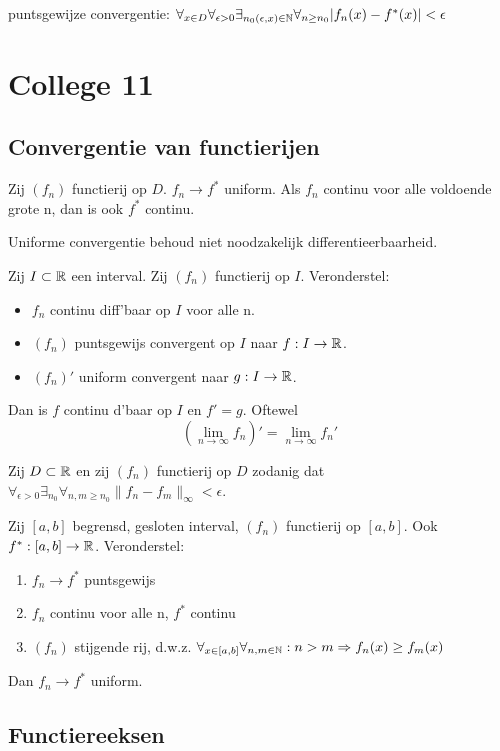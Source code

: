 \documentclass[week=1]{homework}
\begin{document}
	\Letop puntsgewijze convergentie:
	$\forall_{x \in D} \forall_{\epsilon > 0} \exists_{n_0(\epsilon, x) \in \naturals} \forall_{n \ge n_0} |f_n(x) - f^*(x)| < \epsilon$ 
	
	\newpage
	\section*{College 11}
	
	\subsection*{Convergentie van functierijen}
	
	\Stel Zij $(f_n)$ functierij op $D$. $f_n \to f^*$ uniform. Als $f_n$ continu voor alle voldoende grote n, dan is ook $f^*$ continu. 
	
	\Letop Uniforme convergentie behoud niet noodzakelijk differentieerbaarheid. 
	
	\Stel Zij $I \subset \mathbb{R}$ een interval. Zij $(f_n)$ functierij op $I$. Veronderstel:
	\begin{itemize}
		\item $f_n$ continu diff'baar op $I$ voor alle n. 
		\item $(f_n)$ puntsgewijs convergent op $I$ naar $f: I \to \mathbb{R}$. 
		\item $(f_n)'$ uniform convergent naar $g : I \to \mathbb{R}$.
	\end{itemize}
	Dan is $f$ continu d'baar op $I$ en $f' = g$. Oftewel 
	\[
		\left(\lim_{n \to \infty} f_n \right)' = \lim_{n \to \infty} f_n'
	\]
	
	 Zij $D \subset \mathbb{R}$ en zij $(f_n)$ functierij op $D$ zodanig dat $\forall_{\epsilon > 0} \exists_{n_0} \forall_{n,m \ge n_0} \|f_n - f_m \|_{\infty} < \epsilon $.
	
	 Zij $[a,b]$ begrensd, gesloten interval, $(f_n)$ functierij op $[a,b]$. Ook $f^* : [a,b] \to \mathbb{R}$. Veronderstel:
	\begin{enumerate}
		\item $f_n \to f^*$ puntsgewijs
		\item $f_n$ continu voor alle n, $f^*$ continu
		\item $(f_n)$ stijgende rij, d.w.z. $\forall_{x \in [a,b]} \forall_{n,m \in \mathbb{N}} : n > m \Rightarrow f_n(x) \ge f_m(x)$
	\end{enumerate}
	Dan $f_n \to f^*$ uniform.
	
	\subsection*{Functiereeksen}
\end{document}
